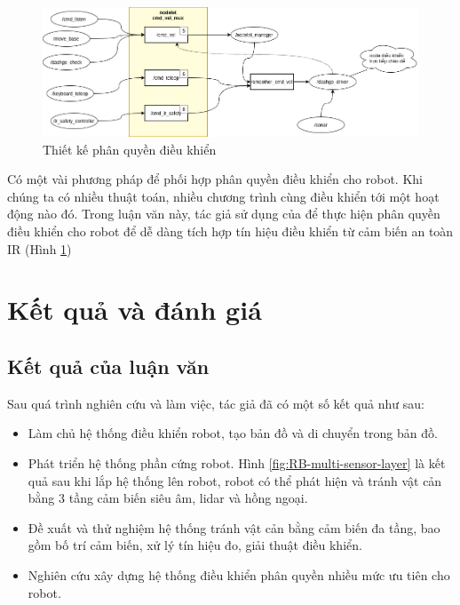
\begin{figure}[htbp]
    \centering
    \includegraphics[width=\linewidth]{figures/phanquen-dexuat.png}
    \caption{Thiết kế phân quyền điều khiển}
    \label{fig:phanquen-dexuat}
\end{figure}

Có một vài phương pháp để phối hợp phân quyền điều khiển cho robot. Khi chúng ta có nhiều thuật toán, nhiều chương trình cùng điều khiển tới một hoạt động nào đó.
Trong luận văn này, tác giả sử dụng  của  để thực hiện phân quyền điều khiển cho robot để dễ dàng tích hợp tín hiệu điều khiển từ cảm biến an toàn IR (Hình \ref{fig:phanquen-dexuat})

\section{Kết quả và đánh giá}
\label{sec:testbed}


\subsection{Kết quả của luận văn}

Sau quá trình nghiên cứu và làm việc, tác giả đã có một số kết quả như sau:
\begin{itemize}
    \item Làm chủ hệ thống điều khiển robot, tạo bản đồ và di chuyển trong bản đồ.
    \item Phát triển hệ thống phần cứng robot. Hình \ref{fig:RB-multi-sensor-layer} là kết quả sau khi lắp hệ thống lên robot, robot có thể phát hiện và tránh vật cản bằng 3 tầng cảm biến siêu âm, lidar và hồng ngoại.
    \item Đề xuất và thử nghiệm hệ thống tránh vật cản bằng cảm biến đa tầng, bao gồm bố trí cảm biến, xử lý tín hiệu đo, giải thuật điều khiển.
    \item Nghiên cứu xây dựng hệ thống điều khiển phân quyền nhiều mức ưu tiên cho robot.
\end{itemize}

